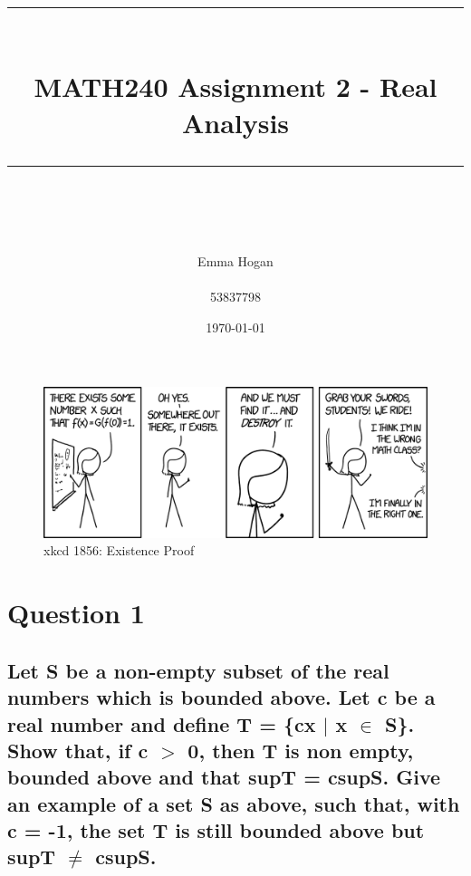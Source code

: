 \documentclass{article}
\title{	
	\normalfont\normalsize
	\vspace{25pt} %
	\rule{\linewidth}{0.5pt}\\ %
	\vspace{20pt} %
	{\huge MATH240 Assignment 2 - Real Analysis}\\ %
	\vspace{12pt} %
	\rule{\linewidth}{2pt}\\ %
	\vspace{12pt} %
}
\author{\LARGE Emma Hogan \\\\53837798} %
\date{\normalsize\today} %
\begin{document}
\begin{titlepage}
\maketitle
\thispagestyle{empty}
\begin{figure}[!htb]
\centering
\includegraphics[width=\textwidth]{xkcd.png}
\caption*{xkcd 1856: Existence Proof}
\end{figure}
\end{titlepage}
\section*{Question 1}
\subsection*{Let S be a non-empty subset of the real numbers which is bounded above. Let c be a real number and define T = \{cx $\mid$ x $\in$ S\}. Show that, if c $>$ 0, then T is non empty, bounded above and that supT = csupS. Give an example of a set S as above, such that, with c = -1, the set T is still bounded above but supT $\ne$ csupS.}
\end{document}
